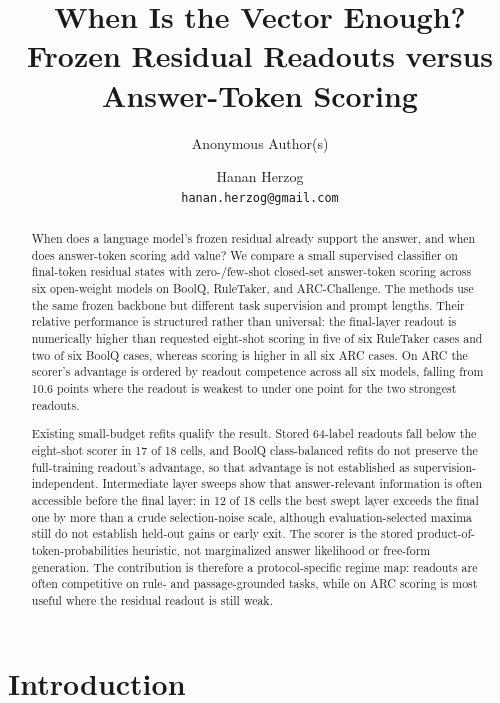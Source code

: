 \title{\textbf{When Is the Vector Enough?\\
Frozen Residual Readouts versus Answer-Token Scoring}}
\ifdefined\AnonymousVersion
\author{Anonymous Author(s)}
\date{}
\else
\author{
  Hanan Herzog\\
  \texttt{hanan.herzog@gmail.com}
}
\date{}
\fi


\maketitle

\begin{abstract}
When does a language model's frozen residual already support the answer, and
when does answer-token scoring add value? We compare a small supervised
classifier on final-token residual states with zero-/few-shot closed-set
answer-token scoring across six open-weight models on BoolQ, RuleTaker, and
ARC-Challenge. The methods use the same frozen backbone but different task
supervision and prompt lengths. Their relative performance is structured
rather than universal: the final-layer readout is numerically higher than
requested eight-shot scoring in five of six RuleTaker cases and two of six
BoolQ cases, whereas scoring is higher in all six ARC cases. On ARC the
scorer's advantage is ordered by readout competence across all six models,
falling from 10.6 points where the readout is weakest to under one point for
the two strongest readouts.

Existing small-budget refits qualify the result. Stored 64-label readouts
fall below the eight-shot scorer in 17 of 18 cells, and BoolQ
class-balanced refits do not preserve the full-training readout's advantage,
so that advantage is not established as supervision-independent. Intermediate
layer sweeps show that answer-relevant information is often accessible before
the final layer: in 12 of 18 cells the best swept layer exceeds the final one
by more than a crude selection-noise scale, although evaluation-selected
maxima still do not establish held-out gains or early exit. The scorer is the stored product-of-token-probabilities
heuristic, not marginalized answer likelihood or free-form generation. The
contribution is therefore a protocol-specific regime map: readouts are often
competitive on rule- and passage-grounded tasks, while on ARC scoring is most
useful where the residual readout is still weak.
\end{abstract}

\section{Introduction}

